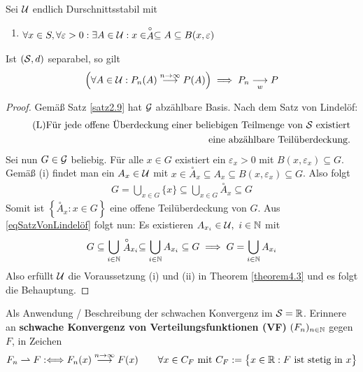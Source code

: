\begin{korollar}\label{korollar4.4}
Sei $\U$ endlich Durschnittsstabil mit
\begin{enumerate}[label=(\roman*)]
\item $\begin{aligned}
\forall x\in S,\forall\varepsilon>0:\exists A\in\U:x\in\stackrel{\circ}{A}\subseteq A\subseteq B(x,\varepsilon)
\end{aligned}$
\end{enumerate}
Ist $(\S,d)$ separabel, so gilt
\begin{align*}
\Big(\forall A\in\U:P_n(A)\stackrel{n\to\infty}{\longrightarrow} P(A)\Big)
\implies P_n\stackrelnew{w}{}{\longrightarrow} P
\end{align*}
\end{korollar}

\begin{proof}
Gemäß Satz \ref{satz2.9} hat $\G$ abzählbare Basis. Nach dem Satz von Lindelöf:
\begin{align}\label{eqSatzVonLindelöf}\tag{L}
\text{Für jede offene Überdeckung einer beliebigen Teilmenge von $\S$ existiert}\\\nonumber\text{eine abzählbare Teilüberdeckung.}
\end{align}
Sei nun $G\in\G$ beliebig. Für alle $x\in G$ existiert ein $\varepsilon_x>0$ mit $B(x,\varepsilon_x)\subseteq G$.
Gemäß (i) findet man ein $A_x\in\U$ mit $x\in\stackrel{\circ}{A}_x\subseteq A_x\subseteq B(x,\varepsilon_x)\subseteq G$. Also folgt
\begin{align*}
G=\bigcup\limits_{x\in G}\lbrace x\rbrace\subseteq\bigcup\limits_{x\in G}\stackrel{\circ}{A}_x\subseteq G
\end{align*}
Somit ist $\left\lbrace\stackrel{\circ}{A}_x:x\in G\right\rbrace$ eine offene Teilüberdeckung von $G$. Aus \eqref{eqSatzVonLindelöf} folgt nun: Es existieren $A_{x_i}\in\U,~i\in\N$ mit
\begin{align*}
G\subseteq\bigcup\limits_{i\in\N}\stackrel{\circ}{A}_{x_i}\subseteq 
\bigcup\limits_{i\in\N}A_{x_i}\subseteq 
G
\implies
G=\bigcup\limits_{i\in\N}A_{x_i}
\end{align*}
Also erfüllt $\U$ die Voraussetzung (i) und (ii) in Theorem \ref{theorem4.3} und es folgt die Behauptung.
\end{proof}

Als Anwendung / Beschreibung der schwachen Konvergenz im $\S=\R$. Erinnere an \textbf{schwache Konvergenz von Verteilungsfunktionen (VF)} $(F_n)_{n\in\N}$ gegen $F$, in Zeichen
\begin{align*}
F_n\rightharpoonup F
:\Longleftrightarrow
F_n(x)\stackrel{n\to\infty}{\longrightarrow} F(x)\qquad\forall x\in C_F
\mit C_F:=\big\lbrace x\in\R:F\text{ ist stetig in }x\big\rbrace
\end{align*}


